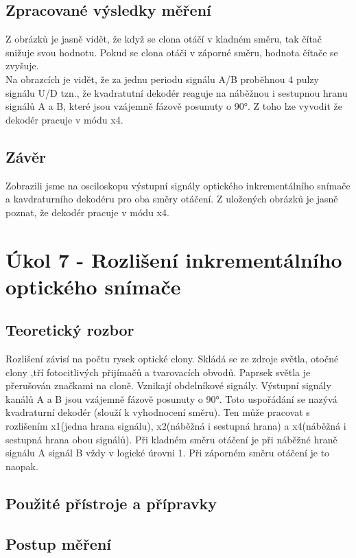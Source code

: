 \documentclass{protokol}
\begin{document}
    \clearpage
    \subsection{Zpracované výsledky měření}
    \noindent Z obrázků je jasně vidět, že když se clona otáčí v kladném směru, tak čítač snižuje svou hodnotu. Pokud se clona otáči v záporné směru, hodnota čítače se zvyšuje. \\
    \noindent Na obrazcích je vidět, že za jednu periodu signálu A/B proběhnou 4 pulzy signálu U/D tzn., že kvadratutní dekodér reaguje na náběžnou i sestupnou hranu signálů A a B, které jsou vzájemně fázově posunuty o 90°. Z toho lze vyvodit že dekodér pracuje v módu x4.

    \subsection{Závěr}
    \noindent Zobrazili jsme na osciloskopu výstupní signály optického inkrementálního snímače a kavdraturního dekodéru pro oba směry otáčení. Z uložených obrázků je jasně poznat, že dekodér pracuje v módu x4.

\pagebreak


\section{Úkol 7 - Rozlišení inkrementálního optického snímače}
    \subsection{Teoretický rozbor}
    \noindent Rozlišení závisí na počtu rysek optické clony. Skládá se ze zdroje světla, otočné clony ,tří fotocitlivých přijímačů a tvarovacích obvodů. Paprsek světla je přerušován značkami na cloně. Vznikají obdelníkové signály. Výstupní signály kanálů A a B jsou vzájemně fázově posunuty o 90°. Toto uspořádání se nazývá kvadraturní dekodér (slouží k vyhodnocení směru). Ten může pracovat s rozlišením x1(jedna hrana signálu), x2(náběžná i sestupná hrana) a x4(náběžná i sestupná hrana obou signálů). Při kladném směru otáčení je při náběžné hraně signálu A signál B vždy v logické úrovni 1. Při záporném směru otáčení je to naopak. 

    \subsection{Použité přístroje a přípravky}

    \subsection{Postup měření}
\end{document}
